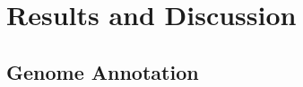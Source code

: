 \section*{Results and Discussion}

\subsection*{Genome Annotation}
\graphicspath{{images/genomeAnnotation}}
	
